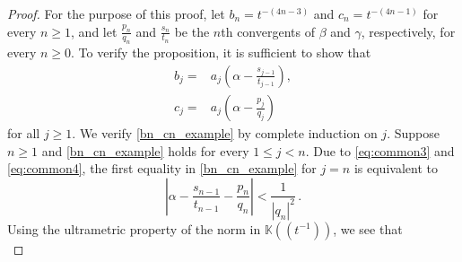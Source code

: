 \documentclass[10pt,a4paper]{amsart}
\def\bbk{\mathbb{K}}
\def\fq{\bbk}
\def\fttt{\fq\!\left(\!\left(t^{-1}\right)\!\right)}
\begin{document}
\begin{proof}
For the purpose of this proof, let $b_n=t^{-(4n-3)}$ and $c_n=t^{-(4n-1)}$ for every $n\geq1$, and let $\frac{p_n}{q_n}$ and $\frac{s_n}{t_n}$ be the $n$th convergents of $\beta$ and $\gamma$, respectively, for every $n\geq0$. %
 To verify the proposition, it is sufficient to show that
\begin{equation}
\begin{split}
\label{bn_cn_example}
b_j=&a_j\left(\alpha-\frac{s_{j-1}}{t_{j-1}}\right),\\
c_j=&a_j\left(\alpha-\frac{p_{j}}{q_{j}}\right)
\end{split}
\end{equation}
for all $j\ge 1$.
We verify \eqref{bn_cn_example} by complete induction on $j$. 
Suppose $n\geq1$ and \eqref{bn_cn_example} holds for every $1\leq j<n$. Due to \eqref{eq:common3} and \eqref{eq:common4}, the first equality in \eqref{bn_cn_example} for $j=n$ is equivalent to 
\begin{equation}
\label{ex_step1_prop}
\left|\alpha-\frac{s_{n-1}}{t_{n-1}}-\frac{p_n}{q_n}\right|<\frac{1}{|q_n|^2}\,.
\end{equation}
Using the ultrametric property of the norm in $\fttt$, we see that
\begin{equation}

\end{equation}
\end{proof}
\end{document}
